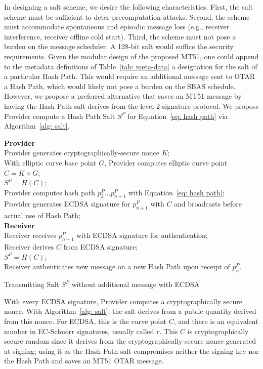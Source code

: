 \documentclass[letterpaper,times]{IONconf/IONconf}
\begin{document}
			In designing a salt scheme, we desire the following characteristics.
			First, the salt scheme must be sufficient to deter precomputation attacks.
			Second, the scheme must accommodate spontaneous and episodic message loss (e.g., receiver interference, receiver offline cold start).
			Third, the scheme must not pose a burden on the message scheduler.
			A 128-bit salt would suffice the security requirements.
			Given the modular design of the proposed MT51, one could append to the metadata definitions of Table~\ref{tab: meta-data} a designation for the salt of a particular Hash Path.
			This would require an additional message sent to OTAR a Hash Path, which would likely not pose a burden on the SBAS schedule.
			However, we propose a preferred alternative that saves an MT51 message by having the Hash Path salt derives from the level-2 signature protocol.
			We propose Provider compute a Hash Path Salt $S^P$ for Equation~\eqref{eq: hash path} via Algorithm~\ref{alg: salt}.

			\begin{algorithm}%
				\SetAlgoLined
				{\bf Provider} \\
				Provider generates cryptographically-secure nonce $K$; \\
				With elliptic curve base point $G$, Provider computes elliptic curve point $C = K \times G$; \\
				$S^P = H(C)$; \\
				Provider computes hash path $p^P_2 ... p^P_{n+1}$ with Equation~\eqref{eq: hash path}; \\
				Provider generates ECDSA signature for $p^P_{n+1}$ with $C$ and broadcasts before actual use of Hash Path; \\
				{\bf Receiver} \\
				Receiver receives $p^P_{n+1}$ with ECDSA signature for authentication; \\
				Receiver derives $C$ from ECDSA signature; \\
				$S^P = H(C)$; \\
				Receiver authenticates new message on a new Hash Path upon receipt of $p^P_n$.
				\caption{Transmitting Salt $S^P$ without additional message with ECDSA}
				\label{alg: salt}
			\end{algorithm}

			With every ECDSA signature, Provider computes a cryptographically secure nonce.
			With Algorithm~\ref{alg: salt}, the salt derives from a public quantity derived from this nonce.
			For ECDSA, this is the curve point $C$, and there is an equivalent number in EC-Schnorr signatures, usually called $r$.
			This $C$ is cryptographically secure random since it derives from the cryptographically-secure nonce generated at signing; using it as the Hash Path salt compromises neither the signing key nor the Hash Path and saves an MT51 OTAR message.
\end{document}
